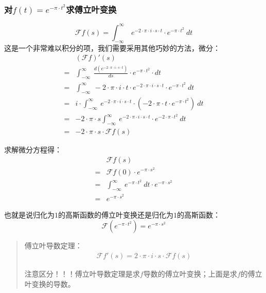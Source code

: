 \subsubsection{对$f(t)=e^{-\pi\cdot t^2}$求傅立叶变换}
$$
	\mathcal{F}f(s)=\int_{-\infty}^{\infty}\ e^{-2\cdot \pi\cdot i\cdot s\cdot t}\cdot e^{-\pi\cdot t^2}\ dt
$$
这是一个非常难以积分的项，我们需要采用其他巧妙的方法，微分：
\begin{align*}
	  & (\mathcal{F}f)'(s)                                                                                                      \\
	= & \int_{-\infty}^{\infty}\ \frac{d(e^{-2\cdot \pi\cdot i\cdot s\cdot t})}{ds}\cdot e^{-\pi\cdot t^2}\cdot dt              \\
	= & \int_{-\infty}^{\infty}\ -2\cdot\pi\cdot i\cdot t\cdot e^{-2\cdot \pi\cdot i\cdot s\cdot t}\cdot e^{-\pi\cdot t^2}\ dt  \\
	= & i\cdot \int_{-\infty}^{\infty}\ e^{-2\cdot \pi\cdot i\cdot s\cdot t}\cdot(-2\cdot\pi\cdot t\cdot e^{-\pi\cdot t^2})\ dt \\
	= & -2\cdot\pi\cdot s \int_{-\infty}^{\infty}\ e^{-2\cdot \pi\cdot i\cdot s\cdot t}\cdot e^{-2\cdot\pi\cdot t^2}\ dt        \\
	= & -2\cdot\pi\cdot s\cdot \mathcal{F}f(s)
\end{align*}

求解微分方程得：
\begin{align*}
	  & \mathcal{F}f(s)                                                       \\
	= & \mathcal{F}f(0)\cdot e^{-\pi\cdot s^2}                                \\
	= & \int_{-\infty}^{\infty}\ e^{-\pi\cdot t^2}\ dt\cdot e^{-\pi\cdot s^2} \\
	= & e^{-\pi\cdot s^2}
\end{align*}

也就是说归化为$1$的高斯函数的傅立叶变换还是归化为$1$的高斯函数：
\begin{equation}
	\mathcal{F}(e^{-\pi\cdot t^2})=e^{-\pi\cdot s^2}
\end{equation}
\begin{quote}
	傅立叶导数定理：
	\begin{align*}
		\mathcal{F}f'(s)
		=2\cdot\pi\cdot i\cdot s\cdot \mathcal{F}f(s)
	\end{align*}

	注意区分！！！傅立叶导数定理是求$f$导数的傅立叶变换；上面是求$f$的傅立叶变换的导数。
\end{quote}


